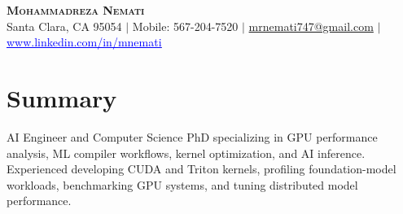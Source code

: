 \documentclass[letterpaper,13pt]{article}
\begin{document}
\begin{center}
    \textbf{\LARGE \scshape Mohammadreza Nemati} \\ \vspace{1pt}
    \small Santa Clara, CA 95054 $|$ Mobile: 567-204-7520 $|$
    \href{mailto:mrnemati747@gmail.com}{mrnemati747@gmail.com} $|$
    \href{https://www.linkedin.com/in/mnemati/}{\textcolor{blue}{\underline{www.linkedin.com/in/mnemati}}}
\end{center}

\section{Summary}
\small{AI Engineer and Computer Science PhD specializing in GPU performance analysis, ML compiler workflows, kernel optimization, and AI inference. Experienced developing CUDA and Triton kernels, profiling foundation-model workloads, benchmarking GPU systems, and tuning distributed model performance.}
\vspace{0.05cm}
\end{document}
